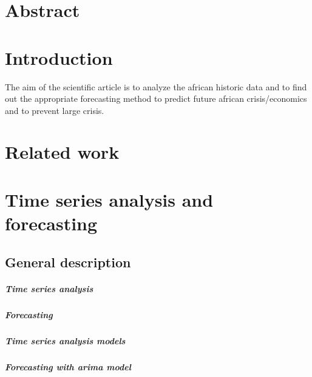 




\chapter{Abstract}\label{abstract}


\chapter{Introduction}\label{introduction}
The aim of the scientific article is to analyze the african historic data and to find out the appropriate forecasting method to predict future african crisis/economics and to prevent large crisis.

\chapter{Related work}\label{related}

\chapter{Time series analysis and forecasting}\label{forecasting}
\section{General description}\label{general_description}

\paragraph{Time series analysis}

\paragraph{Forecasting}


\paragraph{Time series analysis models}

\paragraph{Forecasting with \ac{arima} model}

